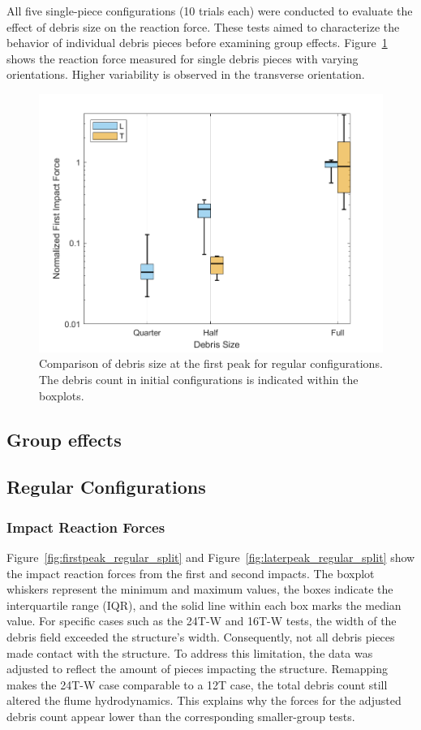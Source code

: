 \documentclass{article}
\begin{document}
{All five single-piece configurations (10 trials each) were conducted to evaluate the effect of debris size on the reaction force. These tests aimed to characterize the behavior of individual debris pieces before examining group effects. Figure~\ref{fig:firstpeak_regular} shows the reaction force measured for single debris pieces with varying orientations. Higher variability is observed in the transverse orientation. 

\begin{figure}[htbp]
    \centering
    \includegraphics[width=\textwidth]{FirstPeak_Regular_SplitByTrial_single.png}
    \caption{Comparison of debris size at the first peak for regular configurations. The debris count in initial configurations is indicated within the boxplots.}
    \label{fig:firstpeak_regular}
\end{figure}


\subsection{Group effects}
\subsection{Regular Configurations}
\subsubsection{Impact Reaction Forces} 
Figure~\ref{fig:firstpeak_regular_split} and Figure~\ref{fig:laterpeak_regular_split} show the impact reaction forces from the first and second impacts. The boxplot whiskers represent the minimum and maximum values, the boxes indicate the interquartile range (IQR), and the solid line within each box marks the median value.
For specific cases such as the 24T-W and 16T-W tests, the width of the debris field exceeded the structure’s width. Consequently, not all debris pieces made contact with the structure. To address this limitation, the data was adjusted to reflect the amount of pieces impacting the structure.  Remapping makes the 24T-W case comparable to a 12T case, the total debris count still altered the flume hydrodynamics. This explains why the forces for the adjusted debris count appear lower than the corresponding smaller-group tests. 

}
\end{document}
